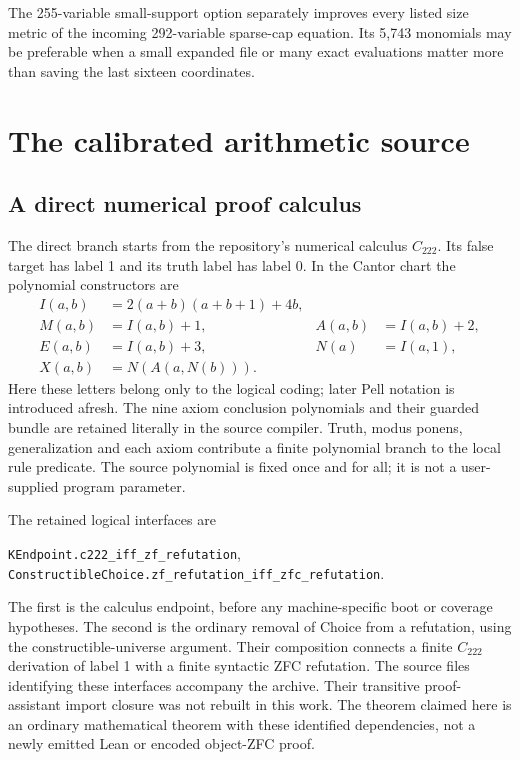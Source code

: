 \documentclass[11pt]{article}
\theoremstyle{definition}\newtheorem{definition}[theorem]{Definition}
\theoremstyle{remark}\newtheorem{remark}[theorem]{Remark}
\newcommand{\code}[1]{\nolinkurl{#1}}
\begin{document}
The 255-variable small-support option separately improves every listed size metric of the incoming 292-variable sparse-cap equation. Its 5,743 monomials may be preferable when a small expanded file or many exact evaluations matter more than saving the last sixteen coordinates.

\section{The calibrated arithmetic source}

\subsection{A direct numerical proof calculus}

The direct branch starts from the repository's numerical calculus $C_{222}$. Its false target has label 1 and its truth label has label 0. In the Cantor chart the polynomial constructors are
\begin{align*}
 I(a,b)&=2(a+b)(a+b+1)+4b,\\
 M(a,b)&=I(a,b)+1,& A(a,b)&=I(a,b)+2,\\
 E(a,b)&=I(a,b)+3,& N(a)&=I(a,1),\\
 X(a,b)&=N(A(a,N(b))).
\end{align*}
Here these letters belong only to the logical coding; later Pell notation is introduced afresh. The nine axiom conclusion polynomials and their guarded bundle are retained literally in the source compiler. Truth, modus ponens, generalization and each axiom contribute a finite polynomial branch to the local rule predicate. The source polynomial is fixed once and for all; it is not a user-supplied program parameter.

The retained logical interfaces are
\begin{center}\small
\code{KEndpoint.c222_iff_zf_refutation},\\
\code{ConstructibleChoice.zf_refutation_iff_zfc_refutation}.
\end{center}
The first is the calculus endpoint, before any machine-specific boot or coverage hypotheses. The second is the ordinary removal of Choice from a refutation, using the constructible-universe argument. Their composition connects a finite $C_{222}$ derivation of label 1 with a finite syntactic ZFC refutation. The source files identifying these interfaces accompany the archive. Their transitive proof-assistant import closure was not rebuilt in this work. The theorem claimed here is an ordinary mathematical theorem with these identified dependencies, not a newly emitted Lean or encoded object-ZFC proof.
\end{document}
